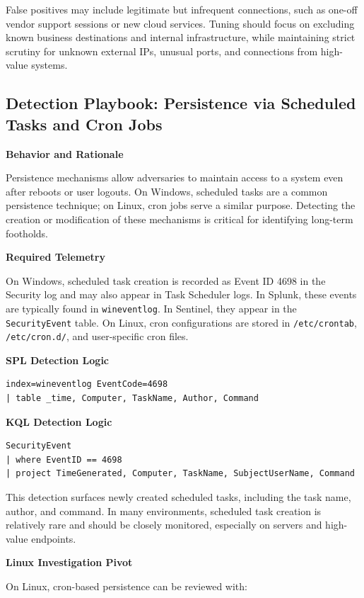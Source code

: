 False positives may include legitimate but infrequent connections, such as one-off vendor support sessions or new cloud services. Tuning should focus on excluding known business destinations and internal infrastructure, while maintaining strict scrutiny for unknown external IPs, unusual ports, and connections from high-value systems.

\subsection*{Detection Playbook: Persistence via Scheduled Tasks and Cron Jobs}

\textbf{Behavior and Rationale}

Persistence mechanisms allow adversaries to maintain access to a system even after reboots or user logouts. On Windows, scheduled tasks are a common persistence technique; on Linux, cron jobs serve a similar purpose. Detecting the creation or modification of these mechanisms is critical for identifying long-term footholds.

\textbf{Required Telemetry}

On Windows, scheduled task creation is recorded as Event ID 4698 in the Security log and may also appear in Task Scheduler logs. In Splunk, these events are typically found in \texttt{wineventlog}. In Sentinel, they appear in the \texttt{SecurityEvent} table. On Linux, cron configurations are stored in \texttt{/etc/crontab}, \texttt{/etc/cron.d/}, and user-specific cron files.

\textbf{SPL Detection Logic}
\begin{lstlisting}
index=wineventlog EventCode=4698
| table _time, Computer, TaskName, Author, Command
\end{lstlisting}

\textbf{KQL Detection Logic}
\begin{lstlisting}
SecurityEvent
| where EventID == 4698
| project TimeGenerated, Computer, TaskName, SubjectUserName, Command
\end{lstlisting}

This detection surfaces newly created scheduled tasks, including the task name, author, and command. In many environments, scheduled task creation is relatively rare and should be closely monitored, especially on servers and high-value endpoints.

\textbf{Linux Investigation Pivot}

On Linux, cron-based persistence can be reviewed with:

